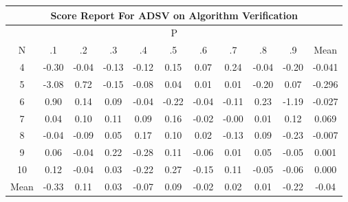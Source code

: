 \documentclass[11pt,a4paper]{report}
\begin{document}
\begin{longtable}{ | c || c | c | c | c | c | c | c | c | c || c |}
\hline
\multicolumn{11}{|c|}{ Score Report For ADSV on Algorithm Verification} \\
\hline
\multicolumn{11}{|c|}{ P } \\
\hline
N & .1 & .2 & .3 & .4 & .5 & .6 & .7 & .8 & .9 & Mean\\
 \hline
 \hline
 \endhead
  4 &  \cellcolor[HTML]{FFF7F7} -0.30 &  \cellcolor[HTML]{FFFFFF} -0.04 &  \cellcolor[HTML]{FFFFFF} -0.13 &  \cellcolor[HTML]{FFFFFF} -0.12 &  \cellcolor[HTML]{FFFFFF} 0.15 &  \cellcolor[HTML]{FFFFFF} 0.07 &  \cellcolor[HTML]{F7F7FF} 0.24 &  \cellcolor[HTML]{FFFFFF} -0.04 &  \cellcolor[HTML]{FFF7F7} -0.20 & -0.041 \\
  5 &  \cellcolor[HTML]{FFAFAF} -3.08 &  \cellcolor[HTML]{EFEFFF} 0.72 &  \cellcolor[HTML]{FFFFFF} -0.15 &  \cellcolor[HTML]{FFFFFF} -0.08 &  \cellcolor[HTML]{FFFFFF} 0.04 &  \cellcolor[HTML]{FFFFFF} 0.01 &  \cellcolor[HTML]{FFFFFF} 0.01 &  \cellcolor[HTML]{FFF7F7} -0.20 &  \cellcolor[HTML]{FFFFFF} 0.07 & -0.296 \\
  6 &  \cellcolor[HTML]{E7E7FF} 0.90 &  \cellcolor[HTML]{FFFFFF} 0.14 &  \cellcolor[HTML]{FFFFFF} 0.09 &  \cellcolor[HTML]{FFFFFF} -0.04 &  \cellcolor[HTML]{FFF7F7} -0.22 &  \cellcolor[HTML]{FFFFFF} -0.04 &  \cellcolor[HTML]{FFFFFF} -0.11 &  \cellcolor[HTML]{F7F7FF} 0.23 &  \cellcolor[HTML]{FFDFDF} -1.19 & -0.027 \\
  7 &  \cellcolor[HTML]{FFFFFF} 0.04 &  \cellcolor[HTML]{FFFFFF} 0.10 &  \cellcolor[HTML]{FFFFFF} 0.11 &  \cellcolor[HTML]{FFFFFF} 0.09 &  \cellcolor[HTML]{FFFFFF} 0.16 &  \cellcolor[HTML]{FFFFFF} -0.02 &  \cellcolor[HTML]{FFFFFF} -0.00 &  \cellcolor[HTML]{FFFFFF} 0.01 &  \cellcolor[HTML]{FFFFFF} 0.12 & 0.069 \\
  8 &  \cellcolor[HTML]{FFFFFF} -0.04 &  \cellcolor[HTML]{FFFFFF} -0.09 &  \cellcolor[HTML]{FFFFFF} 0.05 &  \cellcolor[HTML]{F7F7FF} 0.17 &  \cellcolor[HTML]{FFFFFF} 0.10 &  \cellcolor[HTML]{FFFFFF} 0.02 &  \cellcolor[HTML]{FFFFFF} -0.13 &  \cellcolor[HTML]{FFFFFF} 0.09 &  \cellcolor[HTML]{FFF7F7} -0.23 & -0.007 \\
  9 &  \cellcolor[HTML]{FFFFFF} 0.06 &  \cellcolor[HTML]{FFFFFF} -0.04 &  \cellcolor[HTML]{F7F7FF} 0.22 &  \cellcolor[HTML]{FFF7F7} -0.28 &  \cellcolor[HTML]{FFFFFF} 0.11 &  \cellcolor[HTML]{FFFFFF} -0.06 &  \cellcolor[HTML]{FFFFFF} 0.01 &  \cellcolor[HTML]{FFFFFF} 0.05 &  \cellcolor[HTML]{FFFFFF} -0.05 & 0.001 \\
  10 &  \cellcolor[HTML]{FFFFFF} 0.12 &  \cellcolor[HTML]{FFFFFF} -0.04 &  \cellcolor[HTML]{FFFFFF} 0.03 &  \cellcolor[HTML]{FFF7F7} -0.22 &  \cellcolor[HTML]{F7F7FF} 0.27 &  \cellcolor[HTML]{FFFFFF} -0.15 &  \cellcolor[HTML]{FFFFFF} 0.11 &  \cellcolor[HTML]{FFFFFF} -0.05 &  \cellcolor[HTML]{FFFFFF} -0.06 & 0.000 \\
 \hline
 \hline
Mean &  \cellcolor[HTML]{FFF7F7} -0.33 &  \cellcolor[HTML]{FFFFFF} 0.11 &  \cellcolor[HTML]{FFFFFF} 0.03 &  \cellcolor[HTML]{FFFFFF} -0.07 &  \cellcolor[HTML]{FFFFFF} 0.09 &  \cellcolor[HTML]{FFFFFF} -0.02 &  \cellcolor[HTML]{FFFFFF} 0.02 &  \cellcolor[HTML]{FFFFFF} 0.01 &  \cellcolor[HTML]{FFF7F7} -0.22 &  \cellcolor[HTML]{FFFFFF} -0.04
\end{longtable}
\end{document}
